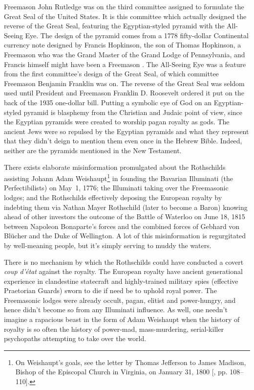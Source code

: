 \documentclass[letterpaper,12pt]{article}
\begin{document}
{    Freemason John Rutledge \cite{Roberts1994,WJS1920} was on the third committee assigned to formulate the Great Seal of the United States. It is this committee which actually designed the reverse of the Great Seal, featuring the Egyptian-styled pyramid with the All-Seeing Eye. The design of the pyramid comes from a 1778 fifty-dollar Continental currency note designed by Francis Hopkinson, the son of Thomas Hopkinson, a Freemason who was the Grand Master of the Grand Lodge of Pennsylvania, and Francis himself might have been a Freemason \cite{Denslow1957}. The All-Seeing Eye was a feature from the first committee's design of the Great Seal, of which committee Freemason Benjamin Franklin was on. The reverse of the Great Seal was seldom used until President and Freemason Franklin D. Roosevelt ordered it put on the back of the 1935 one-dollar bill.} Putting a symbolic eye of God on an Egyptian-styled pyramid is blasphemy from the Christian and Judaic point of view, since the Egyptian pyramids were created to worship pagan royalty as gods. The ancient Jews were so repulsed by the Egyptian pyramids and what they represent that they didn't deign to mention them even once in the Hebrew Bible. Indeed, neither are the pyramids mentioned in the New Testament.

There exists elaborate misinformation promulgated about the Rothschilds assisting Johann Adam Weishaupt\footnote{On Weishaupt's goals, see the letter by Thomas Jefferson to James Madison, Bishop of the Episcopal Church in Virginia, on January 31, 1800 [, pp. 108--110].} in founding the Bavarian Illuminati (the Perfectibilists) on May~1, 1776; the Illuminati taking over the Freemasonic lodges; and the Rothschilds effectively deposing the European royalty by indebting them via Nathan Mayer Rothschild (later to become a Baron) knowing ahead of other investors the outcome of the Battle of Waterloo on June 18, 1815 between Napoleon Bonaparte's forces and the combined forces of Gebhard von Bl\"{u}cher and the Duke of Wellington. A lot of this misinformation is regurgitated by well-meaning people, but it's simply serving to muddy the waters.

There is no mechanism by which the Rothschilds could have conducted a covert \emph{coup d'\'{e}tat} against the royalty. The European royalty have ancient generational experience in clandestine statecraft and highly-trained military spies (effective Praetorian Guards) sworn to die if need be to uphold royal power. The Freemasonic lodges were already occult, pagan, elitist and power-hungry, and hence didn't become so from any Illuminati influence. As well, one needn't imagine a rapacious beast in the form of Adam Weishaupt when the history of royalty is so often the history of power-mad, mass-murdering, serial-killer psychopaths attempting to take over the world.
\end{document}
